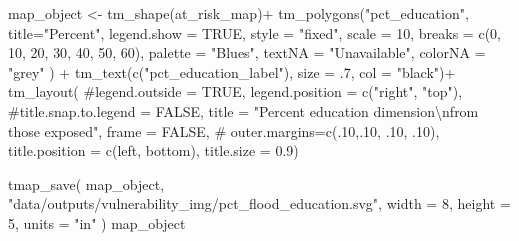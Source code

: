 \documentclass[
  letterpaper,
  DIV=11,
  numbers=noendperiod]{scrartcl}
\newenvironment{Shaded}{}{}
\newcommand{\AttributeTok}[1]{\textcolor[rgb]{0.84,0.23,0.29}{#1}}
\newcommand{\CommentTok}[1]{\textcolor[rgb]{0.42,0.45,0.49}{#1}}
\newcommand{\ConstantTok}[1]{\textcolor[rgb]{0.00,0.36,0.77}{#1}}
\newcommand{\DecValTok}[1]{\textcolor[rgb]{0.00,0.36,0.77}{#1}}
\newcommand{\FloatTok}[1]{\textcolor[rgb]{0.00,0.36,0.77}{#1}}
\newcommand{\FunctionTok}[1]{\textcolor[rgb]{0.44,0.26,0.76}{#1}}
\newcommand{\NormalTok}[1]{\textcolor[rgb]{0.14,0.16,0.18}{#1}}
\newcommand{\OtherTok}[1]{\textcolor[rgb]{0.44,0.26,0.76}{#1}}
\newcommand{\SpecialCharTok}[1]{\textcolor[rgb]{0.00,0.36,0.77}{#1}}
\newcommand{\StringTok}[1]{\textcolor[rgb]{0.01,0.18,0.38}{#1}}
\begin{document}
\begin{Shaded}
\begin{Highlighting}[]
\NormalTok{map\_object }\OtherTok{\textless{}{-}}
\FunctionTok{tm\_shape}\NormalTok{(at\_risk\_map)}\SpecialCharTok{+}
  \FunctionTok{tm\_polygons}\NormalTok{(}\StringTok{"pct\_education"}\NormalTok{,}
              \AttributeTok{title=}\StringTok{"Percent"}\NormalTok{, }
              \AttributeTok{legend.show =} \ConstantTok{TRUE}\NormalTok{,}
              \AttributeTok{style =} \StringTok{"fixed"}\NormalTok{,}
              \AttributeTok{scale =} \DecValTok{10}\NormalTok{,}
              \AttributeTok{breaks =} \FunctionTok{c}\NormalTok{(}\DecValTok{0}\NormalTok{, }\DecValTok{10}\NormalTok{, }\DecValTok{20}\NormalTok{, }\DecValTok{30}\NormalTok{, }\DecValTok{40}\NormalTok{, }\DecValTok{50}\NormalTok{, }\DecValTok{60}\NormalTok{),}
              \AttributeTok{palette =} \StringTok{"Blues"}\NormalTok{,}
              \AttributeTok{textNA =} \StringTok{"Unavailable"}\NormalTok{,}
              \AttributeTok{colorNA =} \StringTok{"grey"}
\NormalTok{              ) }\SpecialCharTok{+}
  \FunctionTok{tm\_text}\NormalTok{(}\FunctionTok{c}\NormalTok{(}\StringTok{"pct\_education\_label"}\NormalTok{), }\AttributeTok{size =}\NormalTok{ .}\DecValTok{7}\NormalTok{, }\AttributeTok{col =} \StringTok{"black"}\NormalTok{)}\SpecialCharTok{+}
  \FunctionTok{tm\_layout}\NormalTok{(}
    \CommentTok{\#legend.outside = TRUE,}
    \AttributeTok{legend.position =} \FunctionTok{c}\NormalTok{(}\StringTok{"right"}\NormalTok{, }\StringTok{"top"}\NormalTok{),}
    \CommentTok{\#title.snap.to.legend = FALSE,}
    \AttributeTok{title =} 
      \StringTok{"Percent education dimension}\SpecialCharTok{\textbackslash{}n}\StringTok{from those exposed"}\NormalTok{,}
    \AttributeTok{frame =} \ConstantTok{FALSE}\NormalTok{,}
\CommentTok{\#            outer.margins=c(.10,.10, .10, .10), }
            \AttributeTok{title.position =} \FunctionTok{c}\NormalTok{(}\StringTok{\textquotesingle{}left\textquotesingle{}}\NormalTok{, }\StringTok{\textquotesingle{}bottom\textquotesingle{}}\NormalTok{),}
            \AttributeTok{title.size =} \FloatTok{0.9}\NormalTok{)}

\FunctionTok{tmap\_save}\NormalTok{(}
\NormalTok{  map\_object,}
  \StringTok{"data/outputs/vulnerability\_img/pct\_flood\_education.svg"}\NormalTok{,}
  \AttributeTok{width =} \DecValTok{8}\NormalTok{,}
  \AttributeTok{height =} \DecValTok{5}\NormalTok{,}
  \AttributeTok{units =} \StringTok{"in"}
\NormalTok{)}
\NormalTok{map\_object}
\end{Highlighting}
\end{Shaded}
\end{document}
